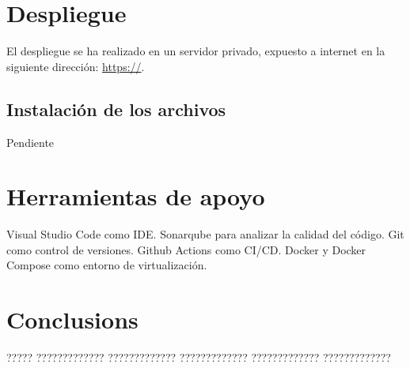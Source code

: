 \documentclass[11pt,spanish,listoffigures,listoftables]{tfgetsinf}
\begin{document}
\chapter{Despliegue}

El despliegue se ha realizado en un servidor privado, expuesto a internet en la siguiente dirección:
\url{https://}.

\section{Instalación de los archivos}

Pendiente

\chapter{Herramientas de apoyo}

Visual Studio Code como IDE.
Sonarqube para analizar la calidad del código.
Git como control de versiones.
Github Actions como CI/CD.
Docker y Docker Compose como entorno de virtualización.




\chapter{Conclusions}

????? ????????????? ????????????? ????????????? ????????????? ????????????? 

\end{document}
